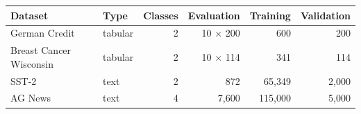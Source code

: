 \begin{tabular}{llrrrr}
\toprule
Dataset & Type & Classes & Evaluation & Training & Validation \\
\midrule
German Credit & tabular & 2 & 10 $\times$ 200 & 600 & 200 \\
Breast Cancer Wisconsin & tabular & 2 & 10 $\times$ 114 & 341 & 114 \\
SST-2 & text & 2 & 872 & 65{,}349 & 2{,}000 \\
AG News & text & 4 & 7{,}600 & 115{,}000 & 5{,}000 \\
\bottomrule
\end{tabular}
